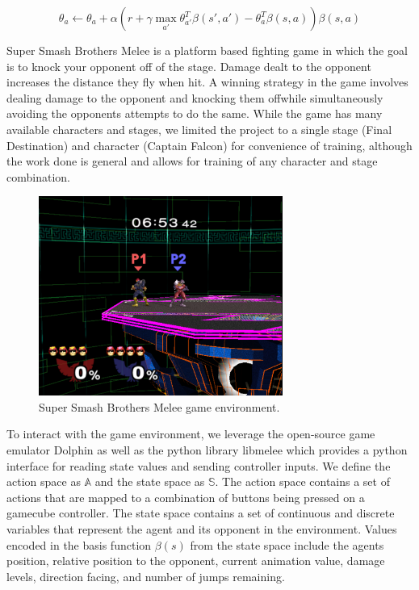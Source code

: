 \begin{equation}
	\theta_a \leftarrow \theta_a+\alpha(r + \gamma \max_{a'} \theta_{a'}^T\beta(s',a') -  \theta_{a}^T\beta(s,a))\beta(s,a)
\end{equation}

Super Smash Brothers Melee is a platform based fighting game in which the goal is to knock your opponent off of the stage. Damage dealt to the opponent increases the distance they fly when hit. A winning strategy in the game involves dealing damage to the opponent and knocking them offwhile simultaneously avoiding the opponents attempts to do the same. While the game has many available characters and stages, we limited the project to a single stage (Final Destination) and character (Captain Falcon) for convenience of training, although the work done is general and allows for training of any character and stage combination.

\begin{figure}[!htb]
\centering
	\includegraphics[width=80mm]{stage.png}
	\caption{Super Smash Brothers Melee game environment. \label{melee}}
\end{figure}

To interact with the game environment, we leverage the open-source game emulator Dolphin as well as the python library libmelee which provides a python interface for reading state values and sending controller inputs. We define the action space as $\mathbb{A}$ and the state space as $\mathbb{S}$. The action space contains a set of actions that are mapped to a combination of buttons being pressed on a gamecube controller. The state space contains a set of continuous and discrete variables that represent the agent and its opponent in the environment. Values encoded in the basis function $\beta(s)$ from the state space include the agents position, relative position to the opponent, current animation value, damage levels, direction facing, and number of jumps remaining.






